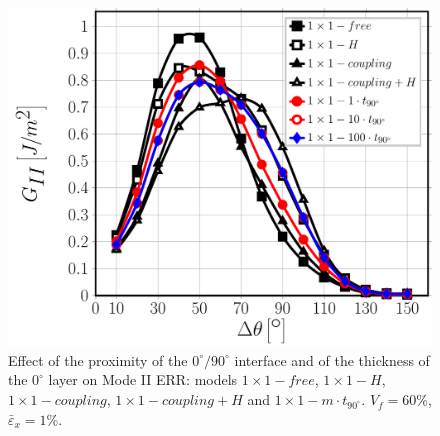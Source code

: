 \begin{figure}[!htb]
\centering
\includegraphics[width=\textwidth]{paperC/1x1-i-vf60-GII.pdf}
\caption{Effect of the proximity of the $0^{\circ}/90^{\circ}$ interface and of the thickness of the $0^{\circ}$ layer on Mode II ERR: models $1\times 1-free$, $1\times 1-H$, $1\times 1-coupling$, $1\times 1-coupling+H$ and $1\times 1-m\cdot t_{90^{\circ}}$. $V_{f}=60\%$, $\bar{\varepsilon}_{x}=1\%$.}\label{paperC:fig:thicknessGII}
\end{figure}


